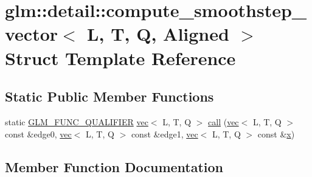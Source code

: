 \hypertarget{structglm_1_1detail_1_1compute__smoothstep__vector}{}\section{glm\+:\+:detail\+:\+:compute\+\_\+smoothstep\+\_\+vector$<$ L, T, Q, Aligned $>$ Struct Template Reference}
\label{structglm_1_1detail_1_1compute__smoothstep__vector}
\subsection*{Static Public Member Functions}
\begin{DoxyCompactItemize}
\item 
static \mbox{\hyperlink{setup_8hpp_a33fdea6f91c5f834105f7415e2a64407}{G\+L\+M\+\_\+\+F\+U\+N\+C\+\_\+\+Q\+U\+A\+L\+I\+F\+I\+ER}} \mbox{\hyperlink{structglm_1_1vec}{vec}}$<$ L, T, Q $>$ \mbox{\hyperlink{structglm_1_1detail_1_1compute__smoothstep__vector_ab8a7f72b134cbe4bda4a77fe9cb395d6}{call}} (\mbox{\hyperlink{structglm_1_1vec}{vec}}$<$ L, T, Q $>$ const \&edge0, \mbox{\hyperlink{structglm_1_1vec}{vec}}$<$ L, T, Q $>$ const \&edge1, \mbox{\hyperlink{structglm_1_1vec}{vec}}$<$ L, T, Q $>$ const \&\mbox{\hyperlink{_s_d_l__opengl_8h_ad0e63d0edcdbd3d79554076bf309fd47}{x}})
\end{DoxyCompactItemize}


\subsection{Member Function Documentation}
\mbox{\label{structglm_1_1detail_1_1compute__smoothstep__vector_ab8a7f72b134cbe4bda4a77fe9cb395d6}} 
